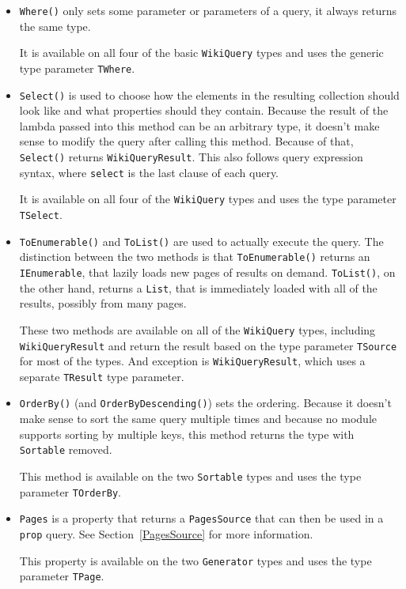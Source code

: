 \begin{itemize}
\item \lstinline{Where()} only sets some parameter or parameters of a query,
it always returns the same type.

It is available on all four of the basic \lstinline{WikiQuery} types
and uses the generic type parameter \lstinline{TWhere}.

\item \lstinline{Select()} is used to choose how the elements in the resulting collection should look like
and what properties should they contain.
Because the result of the lambda passed into this method can be an arbitrary type,
it doesn't make sense to modify the query after calling this method.
Because of that, \lstinline{Select()} returns \lstinline{WikiQueryResult}.
This also follows query expression syntax, where \lstinline{select} is the last clause of each query.

It is available on all four of the \lstinline{WikiQuery} types
and uses the type parameter \lstinline{TSelect}.

\item \lstinline{ToEnumerable()} and \lstinline{ToList()} are used to actually execute the query.
The distinction between the two methods is that \lstinline{ToEnumerable()} returns an \lstinline{IEnumerable},
that lazily loads new pages of results on demand.
\lstinline{ToList()}, on the other hand, returns a \lstinline{List},
that is immediately loaded with all of the results, possibly from many pages.

These two methods are available on all of the \lstinline{WikiQuery} types, including \lstinline{WikiQueryResult}
and return the result based on the type parameter \lstinline{TSource} for most of the types.
And exception is \lstinline{WikiQueryResult}, which uses a separate \lstinline{TResult} type parameter.

\item \lstinline{OrderBy()} (and \lstinline{OrderByDescending()}) sets the ordering.
Because it doesn't make sense to sort the same query multiple times
and because no module supports sorting by multiple keys,
this method returns the type with \lstinline{Sortable} removed.

This method is available on the two \lstinline{Sortable} types
and uses the type parameter \lstinline{TOrderBy}.

\item \lstinline{Pages} is a property that returns a \lstinline{PagesSource}
that can then be used in a \texttt{prop} query.
See Section~\ref{PagesSource} for more information.

This property is available on the two \lstinline{Generator} types
and uses the type parameter \lstinline{TPage}.

\end{itemize}

